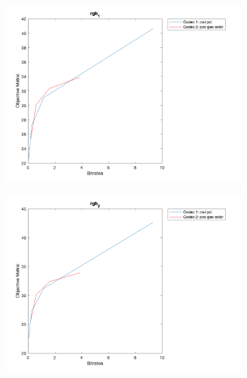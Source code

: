 \documentclass{article}
\begin{document}
\begin{figure}
 \ContinuedFloat
    \begin{subfigure}[b]{0.65\textwidth}
    \includegraphics[width=\textwidth]{Figures/task2/rhetorician_rgb1.png}
    \end{subfigure}

    \begin{subfigure}[b]{0.65\textwidth}
    \includegraphics[width=\textwidth]{Figures/task2/rhetorician_rgb2.png}
    \end{subfigure}
    

\end{figure}
\end{document}
